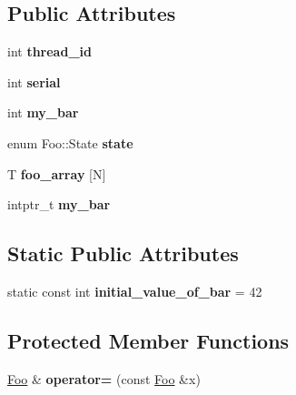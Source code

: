 \subsection*{Public Attributes}
\begin{DoxyCompactItemize}
\item 
\hypertarget{structFoo_aab2ef5d74c273bcc35185c48e4eea1c5}{}int {\bfseries thread\+\_\+id}\label{structFoo_aab2ef5d74c273bcc35185c48e4eea1c5}

\item 
\hypertarget{structFoo_a94d4d72b0aacbe2fea1b2157765c9089}{}int {\bfseries serial}\label{structFoo_a94d4d72b0aacbe2fea1b2157765c9089}

\item 
\hypertarget{structFoo_a7f3808ca9c6d30b5466b7c2e78cde800}{}int {\bfseries my\+\_\+bar}\label{structFoo_a7f3808ca9c6d30b5466b7c2e78cde800}

\item 
\hypertarget{structFoo_a3d1e1cbf15afb555052c11e56c36e371}{}enum Foo\+::\+State {\bfseries state}\label{structFoo_a3d1e1cbf15afb555052c11e56c36e371}

\item 
\hypertarget{structFoo_a6b1cb9353809ab137e7a03595e925600}{}T {\bfseries foo\+\_\+array} \mbox{[}N\mbox{]}\label{structFoo_a6b1cb9353809ab137e7a03595e925600}

\item 
\hypertarget{structFoo_a8a93a437ee7b74389aba9fecbd1099e1}{}intptr\+\_\+t {\bfseries my\+\_\+bar}\label{structFoo_a8a93a437ee7b74389aba9fecbd1099e1}

\end{DoxyCompactItemize}
\subsection*{Static Public Attributes}
\begin{DoxyCompactItemize}
\item 
\hypertarget{structFoo_a29dc2450771534acc358b398442ffeb2}{}static const int {\bfseries initial\+\_\+value\+\_\+of\+\_\+bar} = 42\label{structFoo_a29dc2450771534acc358b398442ffeb2}

\end{DoxyCompactItemize}
\subsection*{Protected Member Functions}
\begin{DoxyCompactItemize}
\item 
\hypertarget{structFoo_ad62ee116ca481f843bfd9b1b9c22fe30}{}\hyperlink{structFoo}{Foo} \& {\bfseries operator=} (const \hyperlink{structFoo}{Foo} \&x)\label{structFoo_ad62ee116ca481f843bfd9b1b9c22fe30}

\end{DoxyCompactItemize}

